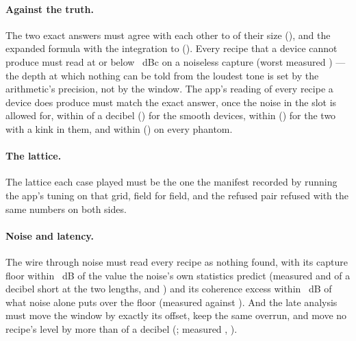 \documentclass[11pt,a4paper]{article}
\begin{document}
\paragraph{Against the truth.} The two exact answers must agree with each other to
\iparityTruthRelativeWords{} of their size (\iparityTruthRelative{}),
and the expanded formula with the integration to \iparityClosedFormWords{}
(\iparityClosedForm{}). Every recipe that a device cannot produce must
read at or below \iparityEmptyDepth{}~dBc on a noiseless capture (worst
measured \iparityWorstEmpty{}) --- the depth at which nothing can be told
from the loudest tone is set by the arithmetic's precision, not by the
window. The app's reading of every recipe a device does produce must
match the exact answer, once the noise in the slot is allowed for, within
\iparityTruthBandlimitedWords{} of a decibel (\iparityTruthBandlimited{})
for the smooth devices, within \iparityTruthKinkedWords{}
(\iparityTruthKinked{}) for the two with a kink in them, and within
\iparityTruthPhantomWords{} (\iparityTruthPhantom{}) on every phantom.

\paragraph{The lattice.} The lattice each case played must be the one the manifest recorded by
running the app's tuning on that grid, field for field, and the refused
pair refused with the same numbers on both sides.

\paragraph{Noise and latency.} The wire through noise
must read every recipe as nothing found, with its capture floor within
\iparityFloor{}~dB of the value the noise's own statistics predict
(measured \iparityFloorLongDeficitWords{} and
\iparityFloorShortDeficitWords{} of a decibel short at the two lengths,
\iparityFloorLongDeficit{} and \iparityFloorShortDeficit{}) and its
coherence excess within \iparityCoherenceNoise{}~dB of what noise alone
puts over the floor (measured \iparityCleanExcess{} against
\iparityCleanExpected{}). And the late analysis must move the window by
exactly its offset, keep the same overrun, and move no recipe's level by
more than \iparityLatencyToleranceWords{} of a decibel
(\iparityLatencyTolerance{}; measured \iparityWorstLatencyShiftWords{},
\iparityWorstLatencyShift{}). \iparityPartBStatus
\end{document}
